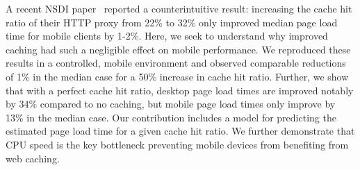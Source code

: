 A recent NSDI paper~\cite{flywheel} reported a counterintuitive result:
increasing the cache hit ratio of their HTTP proxy from 22\% to 32\% only improved median page load time for mobile clients by 1-2\%.
Here, we seek to understand why improved caching had such a negligible effect on mobile performance. 
We reproduced these results in a controlled, mobile environment and observed comparable reductions of 1\% in the median case for a 50\% increase in cache hit ratio.
Further, we show that with a perfect cache hit ratio, desktop page load times are improved notably by 34\% compared to no caching, but mobile page load times only improve by 13\% in the median case. Our contribution includes a model for predicting the estimated page load time for a given cache hit ratio.
We further demonstrate that CPU speed is the key bottleneck preventing mobile devices from benefiting from web caching.



